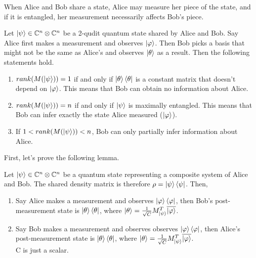 When Alice and Bob share a state, Alice may measure her piece of the state, and if it is entangled, her measurement necessarily affects Bob's piece.

\begin{prop}
\label{entanglement-rank}
Let $\ket{\psi} \in \mathbb{C}^n \otimes \mathbb{C}^{n}$ be a 2-qudit quantum state shared by Alice and Bob. Say Alice first makes a measurement and observes $\ket{\varphi}$. Then Bob picks a basis that might not be the same as Alice's and observes $\ket{\theta}$ as a result. Then the following statements hold.
\begin{enumerate}
    \item $rank(M(\ket{\psi}))=1$ if and only if $\ket{\theta}\bra{\theta}$ is a constant matrix that doesn't depend on $\ket{\varphi}$. This means that Bob can obtain no information about Alice.
    \item $rank(M(\ket{\psi}))=n$ if and only if $\ket{\psi}$ is maximally entangled. This means that Bob can infer exactly the state Alice measured ($\ket{\varphi}$).
    \item If $1<rank(M(\ket{\psi}))<n$, Bob can only partially infer information about Alice.
\end{enumerate}
\end{prop}

First, let's prove the following lemma.




\begin{lemma}
\label{end state lemma}
Let $\ket{\psi} \in \mathbb{C}^n \otimes \mathbb{C}^{n}$ be a quantum state representing a composite system of Alice and Bob.  The shared density matrix is therefore $\rho = \ket{\psi}\bra{\psi}$. Then,
\begin{enumerate}
\item Say Alice makes a measurement and observes $\ket{\varphi}\bra{\varphi}$, then Bob's post-measurement state is $\ket{\theta}\bra{\theta}$, where $\ket{\theta}=\frac{1}{\sqrt{C}}M_{\ket{\psi}}^T \overline{\ket{\varphi}}$.
\item Say Bob makes a measurement and observes observes $\ket{\varphi}\bra{\varphi}$, then Alice's post-measurement state is $\ket{\theta}\bra{\theta}$, where $\ket{\theta}=\frac{1}{\sqrt{C}}M_{\ket{\psi}}^T \overline{\ket{\varphi}}$.\\
C is just a scalar.
\end{enumerate}
\end{lemma}

